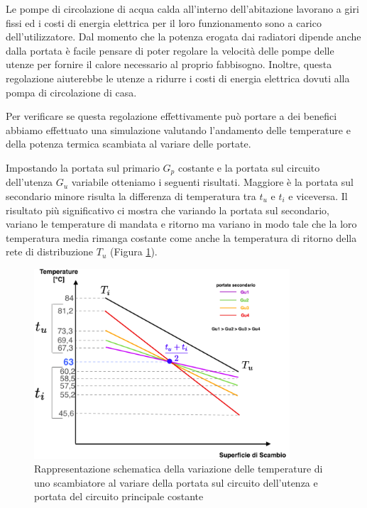 \documentclass[laurea,oneside,11pt]{USiena_tesiLM}
\begin{document}

Le pompe di circolazione di acqua calda all'interno dell'abitazione lavorano a giri fissi ed i costi di energia elettrica per il loro funzionamento sono a carico dell'utilizzatore. Dal momento che la potenza erogata dai radiatori dipende anche dalla portata è facile pensare di poter  regolare la velocità delle pompe delle utenze per fornire il calore necessario al proprio fabbisogno. Inoltre, questa regolazione aiuterebbe le utenze a ridurre i costi di energia elettrica dovuti alla pompa di circolazione di casa.

Per verificare se questa regolazione effettivamente può portare a dei benefici abbiamo effettuato una simulazione valutando  l’andamento delle temperature e della potenza termica scambiata al variare delle portate.

Impostando la portata sul primario $G_p$ costante e la portata sul circuito dell'utenza $G_u$ variabile otteniamo i seguenti risultati.
Maggiore è la portata sul secondario minore risulta la differenza di temperatura tra $t_u$ e $t_i$ e viceversa. Il risultato più significativo ci mostra che variando la portata sul secondario, variano le temperature di mandata e ritorno ma variano in
modo tale che la loro temperatura media rimanga costante come anche la temperatura di ritorno della rete di distribuzione $T_u$ (Figura \ref{fig:pompa_var_utenza}).

\begin{figure}[!ht]
\centering
\includegraphics[width=0.85\textwidth]{figure/pompa_var_utenza} 
\caption{Rappresentazione schematica della variazione delle temperature di uno scambiatore al variare della portata sul circuito dell'utenza e portata del circuito principale costante}
\label{fig:pompa_var_utenza}
\end{figure}
\end{document}
